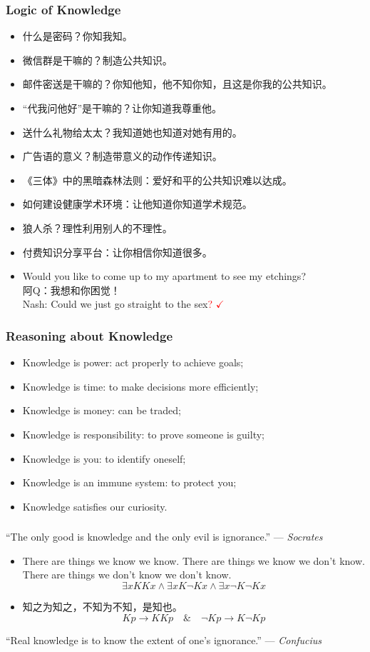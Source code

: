 \documentclass[UTF8,aspectratio=43,11pt,colorlinks,compress,openany]{beamer}%
\begin{document}
\begin{frame}\frametitle{Logic of Knowledge}
\begin{itemize}
	\item 什么是密码？你知我知。
	\item 微信群是干嘛的？制造公共知识。
	\item 邮件密送是干嘛的？你知他知，他不知你知，且这是你我的公共知识。
	\item “代我问他好”是干嘛的？让你知道我尊重他。
	\item 送什么礼物给太太？我知道她也知道对她有用的。
	\item 广告语的意义？制造带意义的动作传递知识。
	\item 《三体》中的黑暗森林法则：爱好和平的公共知识难以达成。
	\item 如何建设健康学术环境：让他知道你知道学术规范。
	\item 狼人杀？理性利用别人的不理性。
	\item 付费知识分享平台：让你相信你知道很多。
	\item Would you like to come up to my apartment to see my etchings?\\
	阿Q：我想和你困觉！\\
	Nash: Could we just go straight to the sex\textcolor{red}{? $\checkmark$\!\!\!\!}
\end{itemize}
\end{frame}

\begin{frame}\frametitle{Reasoning about Knowledge}
\begin{itemize}
	\item Knowledge is power: act properly to achieve goals;
	\item Knowledge is time: to make decisions more efficiently;
	\item Knowledge is money: can be traded;
	\item Knowledge is responsibility: to prove someone is guilty;
	\item Knowledge is you: to identify oneself;
	\item Knowledge is an immune system: to protect you;
	\item Knowledge satisfies our curiosity.
\end{itemize}
\end{frame}

\begin{frame}\frametitle{}
``The only good is knowledge and the only evil is ignorance.'' --- \textsl{Socrates}
\begin{center}
\end{center}
\begin{itemize}
\item There are things we know we know. There are things we know we don't know. There are things we don't know we don't know.
\[\exists xKKx\wedge \exists xK\neg Kx\wedge \exists x\neg K\neg Kx\]
\item 知之为知之，不知为不知，是知也。
\[Kp\to KKp\quad\&\quad\neg Kp\to K\neg Kp\]
\end{itemize}
``Real knowledge is to know the extent of one's ignorance.'' --- \textsl{Confucius}
\end{frame}
\end{document}

